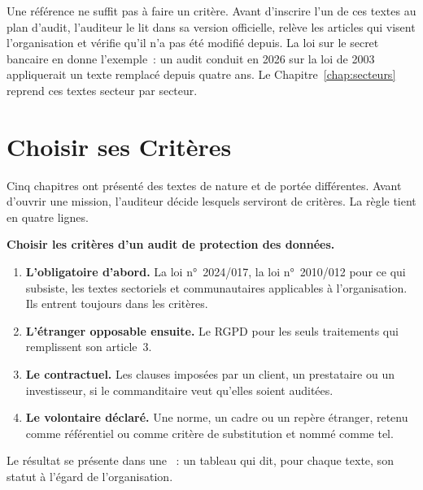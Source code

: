 Une référence ne suffit pas à faire un critère. Avant d'inscrire l'un de ces
textes au plan d'audit, l'auditeur le lit dans sa version officielle, relève
les articles qui visent l'organisation et vérifie qu'il n'a pas été modifié
depuis. La loi sur le secret bancaire en donne l'exemple~: un audit conduit
en 2026 sur la loi de 2003 appliquerait un texte remplacé depuis quatre ans.
Le Chapitre~\ref{chap:secteurs} reprend ces textes secteur par secteur.

\section{Choisir ses Critères}
\label{sec:c07-criteres}

Cinq chapitres ont présenté des textes de nature et de portée différentes.
Avant d'ouvrir une mission, l'auditeur décide lesquels serviront de
critères. La règle tient en quatre lignes.

\begin{boxprocedure}
\textbf{Choisir les critères d'un audit de protection des données.}
\begin{enumerate}
    \item \textbf{L'obligatoire d'abord.} La loi n°~2024/017, la loi
          n°~2010/012 pour ce qui subsiste, les textes sectoriels et
          communautaires applicables à l'organisation. Ils entrent toujours
          dans les critères.
    \item \textbf{L'étranger opposable ensuite.} Le RGPD pour les seuls
          traitements qui remplissent son article~3.
    \item \textbf{Le contractuel.} Les clauses imposées par un client, un
          prestataire ou un investisseur, si le commanditaire veut qu'elles
          soient auditées.
    \item \textbf{Le volontaire déclaré.} Une norme, un cadre ou un repère
          étranger, retenu comme référentiel ou comme critère de
          substitution et nommé comme tel.
\end{enumerate}
\end{boxprocedure}

Le résultat se présente dans une ~: un
tableau qui dit, pour chaque texte, son statut à l'égard de l'organisation.

